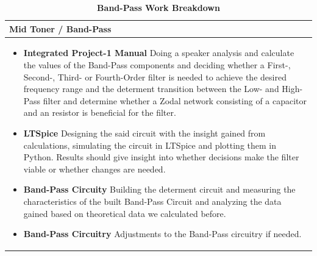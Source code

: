 \begin{table}[h!]
\captionsetup{justification=centering, labelfont=bf}
\caption{\textbf{Band-Pass Work Breakdown}}
\begin{tabular*}{\textwidth}{@{\extracolsep{\fill}} p{} @{}} 
\toprule
     \textbf{Mid Toner / Band-Pass} \\
     \midrule
    \begin{itemize}
        \item \textbf{Integrated Project-1 Manual} \newline Doing a speaker analysis and calculate the values of the Band-Pass components and deciding whether a First-, Second-, Third- or Fourth-Order filter is needed to achieve the desired frequency range and the determent transition between the Low- and High-Pass filter and determine whether a Zodal network consisting of a capacitor and an resistor is beneficial for the filter.
        \item \textbf{LTSpice} \newline Designing the said circuit with the insight gained from calculations, simulating the circuit in LTSpice and plotting them in Python. Results should give insight into whether decisions make the filter viable or whether changes are needed.
        \item \textbf{Band-Pass Circuity} \newline Building the determent circuit and measuring the characteristics of the built Band-Pass Circuit and analyzing the data gained based on theoretical data we calculated before. 
        \item \textbf{Band-Pass Circuitry} \newline Adjustments to the Band-Pass circuitry if needed.
    \end{itemize} \\
     \bottomrule
\end{tabular*}

\label{tab:BP Work Breakdown}
\end{table}

\newpage

